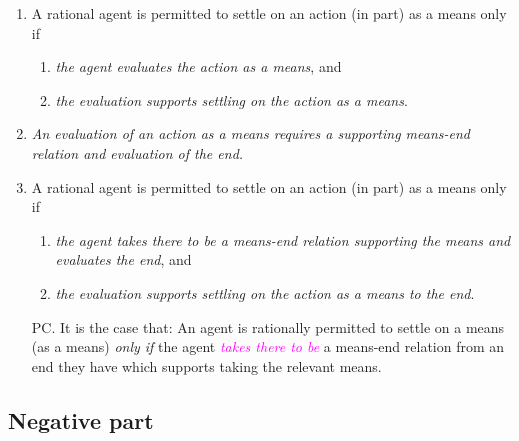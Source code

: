 \documentclass[10pt]{article}
\newcommand{\hozlinedash}[0]{%
  \noindent\hdashrule[0.5ex][c]{\textwidth}{.1pt}{2.5pt}
}
\begin{document}
\hozlinedash


\begin{enumerate}[label=P\arabic*., ref=(P\arabic*)]
\item\label{premise:positive:evaluate-means} A rational agent is permitted to settle on an action (in part) as a means only if
  \begin{enumerate}[label=P\arabic{enumi}\alph*., ref=(P\arabic{enumi}\alph*)]
  \item\label{premise:positive:evaluate-means:evaluate} \emph{the agent evaluates the action as a means}, and
  \item\label{premise:positive:evaluate-means:supports} \emph{the evaluation supports settling on the action as a means}.
  \end{enumerate}
\item\label{premise:positive:principle-dependency} \emph{An evaluation of an action as a means requires a supporting means-end relation and evaluation of the end.}
\item\label{premise:positive:evaluate-end} A rational agent is permitted to settle on an action (in part) as a means only if
  \begin{enumerate}[label=P\arabic{enumi}\alph*., ref=(P\arabic{enumi}\alph*)]
  \item \emph{the agent takes there to be a means-end relation supporting the means and evaluates the end}, and
  \item \emph{the evaluation supports settling on the action as a means to the end}.
  \end{enumerate}
\end{enumerate}

\begin{enumerate}[label=P\arabic*., ref=(P\arabic*), resume]
\item[PC.] It is the case that:
  An agent is rationally permitted to settle on a means (as a means) \emph{only if} the agent \textcolor{fuchsia}{\emph{takes there to be}} a means-end relation from an end they have which supports taking the relevant means.
\end{enumerate}



\newpage

\subsection{Negative part}
\label{sec:negative-part}


\end{document}

